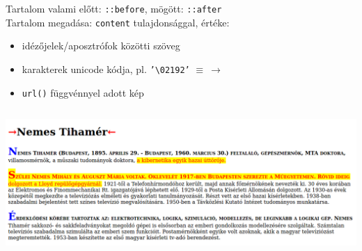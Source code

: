 \begin{frame}
  Tartalom valami előtt: \texttt{::before}, mögött: \texttt{::after}\\
  \vfill
  Tartalom megadása: \texttt{content} tulajdonsággal, értéke:
  \begin{itemize}
    \item idézőjelek/aposztrófok közötti szöveg
    \item karakterek unicode kódja, pl. \texttt{'\textbackslash 02192'} $\equiv ~ \to$
    \item \texttt{url()} függvénnyel adott kép
  \end{itemize}
\end{frame}

\begin{frame}
  \begin{columns}[T]
      \begin{exampleblock}{}
        \fontsize{7}{8} \selectfont
        
      \end{exampleblock}
      \begin{exampleblock}{}
        \fontsize{7}{8} \selectfont
        
      \end{exampleblock}
  \end{columns}
  \begin{exampleblock}{}
    \fontsize{7}{8} \selectfont
    \vspace{-0.1cm}
    
    \vspace{-0.1cm}
  \end{exampleblock}
\end{frame}

\begin{frame}
  \begin{center}
    \includegraphics[width=\textwidth]{pseudoelements.png}\\
  \end{center}
\end{frame}

